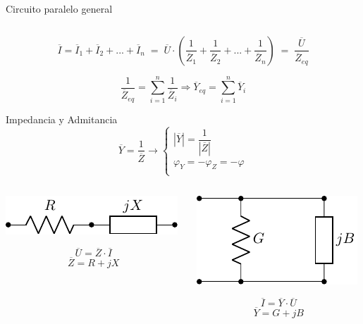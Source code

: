 \documentclass[aspectratio=169, usenames,svgnames,dvipsnames]{beamer}
\begin{document}
\begin{frame}[label={sec:org5b9120d}]{Circuito paralelo general}
\begin{columns}
\begin{column}{0.2\columnwidth}
\begin{center}
\begin{center}
\end{center}
\end{center}
\end{column}
\end{columns}
\[\overline{I} = \overline{I}_1+\overline{I}_2+...+\overline{I}_n \; = \; \overline{U} \cdot\left(\dfrac{1}{\overline{Z}_1}+\dfrac{1}{\overline{Z}_2}+...+\dfrac{1}{\overline{Z}_n}\right) \; = \; \dfrac{\overline{U}}{\overline{Z}_{eq}}\]

\[
  \boxed{\dfrac{1}{\overline{Z}_{eq}}=\sum_{i=1}^n \dfrac{1}{\overline{Z}_i}}%
  \Rightarrow%
  \boxed{\overline{Y}_{eq}=\sum_{i=1}^n \overline{Y}_i}
\]
\end{frame}
\begin{frame}[label={sec:org1386576}]{Impedancia y Admitancia}
\[
\boxed{
  \overline{Y} = \dfrac{1}{\overline{Z}} \rightarrow \left\{%
	\begin{array}{l}
	|\overline{Y}| = \dfrac{1}{|\overline{Z}|}\\[12pt]
    \varphi_Y = -\varphi_Z = - \varphi\\
	\end{array}\right.
	  }
\]
\begin{columns}
\begin{column}{0.5\columnwidth}
\begin{center}
\includegraphics[height=0.1\textheight]{../figs/Z.pdf}
\end{center}
\[
  \overline{U} = \overline{Z} \cdot \overline{I}
\]
\[
  \overline{Z} = R + j X
\]
\end{column}
\begin{column}{0.5\columnwidth}
\begin{center}
\includegraphics[height=0.25\textheight]{../figs/Y.pdf}
\end{center}
\[
  \overline{I} = \overline{Y} \cdot \overline{U}
\]
\[
  \overline{Y} = G + j B
\]
\end{column}
\end{columns}
\end{frame}
\end{document}
